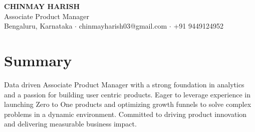 \documentclass[a4paper,10pt]{article}
\begin{document}
\pagestyle{empty}
\begin{center}
    {\Huge \textbf{CHINMAY HARISH}} \\ \vspace{2pt}
    {\Large Associate Product Manager} \\ \vspace{4pt}
    Bengaluru, Karnataka $\cdot$ chinmayharish03@gmail.com $\cdot$ +91 9449124952 \\ \vspace{5pt}
    \href{https://github.com/ChinmayHarish}{\Large\faGithub} \quad
    \href{https://www.linkedin.com/in/chinmay-harish-03106t/}{\Large\faLinkedin} \quad
    \href{https://chinmay-portfolio-p1.netlify.app/}{\Large\faGlobe}
\end{center}
\section{Summary}
Data driven Associate Product Manager with a strong foundation in analytics and a passion for building user centric products. Eager to leverage experience in launching Zero to One products and optimizing growth funnels to solve complex problems in a dynamic environment. Committed to driving product innovation and delivering measurable business impact.
\end{document}
